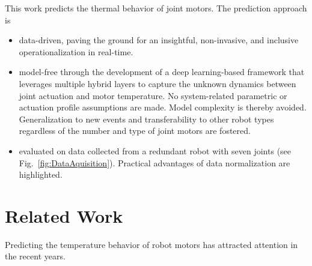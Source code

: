 \documentclass{ifacconf}
\begin{document}
This work predicts  the thermal behavior of joint motors. The prediction approach is
\begin{itemize}
	\item data-driven, paving the ground for an  insightful, non-invasive, and inclusive operationalization in real-time. %
	\item model-free through the development of a deep learning-based framework that leverages multiple hybrid layers to capture the unknown dynamics between joint actuation and motor temperature. No system-related parametric or actuation profile assumptions are made. Model complexity is thereby avoided.  Generalization to new events and transferability to other robot types {regardless of the number and type of joint motors are fostered.}
	\item evaluated on data collected from a redundant robot with seven joints (see Fig.~\ref{fig:DataAquisition}). Practical advantages of data normalization are highlighted.
\end{itemize}




\section{Related Work}
\label{chap:relatedworks}
Predicting the temperature behavior of robot motors has attracted attention in the recent years. %
\end{document}
